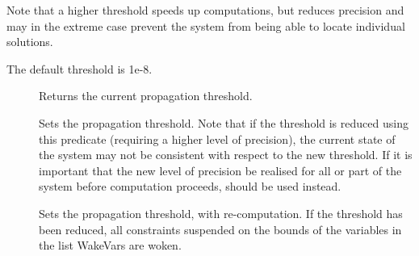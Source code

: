 Note that a higher threshold speeds up computations, but reduces precision
and may in the extreme case prevent the system from being able to locate
individual solutions.

The default threshold is 1e-8.

\begin{description}

\item []
Returns the current propagation threshold.

\item []
Sets the propagation threshold.  Note that if the threshold is reduced using
this predicate (requiring a higher level of precision), the current state of
the system may not be consistent with respect to the new threshold.  If it
is important that the new level of precision be realised for all or part of
the system before computation proceeds,  should be used
instead.

\item []
Sets the propagation threshold, with re-computation.  If the threshold has
been reduced, all constraints suspended on the bounds of the variables in
the list WakeVars are woken.

\end{description}


 
